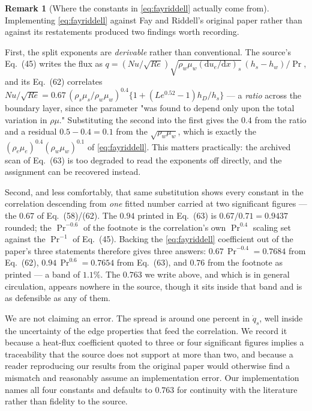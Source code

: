 \documentclass[11pt,a4paper]{article}
\theoremstyle{definition}
\newtheorem{remark}[theorem]{Remark}
\numberwithin{equation}{section}
\newcommand{\diff}{\mathrm{d}}
\begin{document}
\begin{remark}[Where the constants in \cref{eq:fayriddell} actually come from]
\label{rem:frconst}
Implementing \cref{eq:fayriddell} against Fay and Riddell's original paper rather than against its restatements produced two findings worth recording.

First, the split exponents are \emph{derivable} rather than conventional. The source's Eq.~(45) writes the flux as $q = (Nu/\!\sqrt{Re})\sqrt{\rho_w \mu_w (\diff u_e/\diff x)_s}\,(h_s - h_w)/\Pr$, and its Eq.~(62) correlates $Nu/\!\sqrt{Re} = 0.67\,(\rho_s\mu_s/\rho_w\mu_w)^{0.4}\{1 + (Le^{0.52}-1)h_D/h_s\}$ --- a \emph{ratio} across the boundary layer, since the parameter "was found to depend only upon the total variation in $\rho\mu$." Substituting the second into the first gives the $0.4$ from the ratio and a residual $0.5 - 0.4 = 0.1$ from the $\sqrt{\rho_w\mu_w}$, which is exactly the $(\rho_e\mu_e)^{0.4}(\rho_w\mu_w)^{0.1}$ of \cref{eq:fayriddell}. This matters practically: the archived scan of Eq.~(63) is too degraded to read the exponents off directly, and the assignment can be recovered instead.

Second, and less comfortably, that same substitution shows every constant in the correlation descending from \emph{one} fitted number carried at two significant figures --- the $0.67$ of Eq.~(58)/(62). The $0.94$ printed in Eq.~(63) is $0.67/0.71 = 0.9437$ rounded; the $\Pr^{-0.6}$ of the footnote is the correlation's own $\Pr^{0.4}$ scaling set against the $\Pr^{-1}$ of Eq.~(45). Backing the \cref{eq:fayriddell} coefficient out of the paper's three statements therefore gives three answers: $0.67\,\Pr^{-0.4} = 0.7684$ from Eq.~(62), $0.94\,\Pr^{0.6} = 0.7654$ from Eq.~(63), and $0.76$ from the footnote as printed --- a band of $1.1\%$. The $0.763$ we write above, and which is in general circulation, appears nowhere in the source, though it sits inside that band and is as defensible as any of them.

We are not claiming an error. The spread is around one percent in $\dot q_s$, well inside the uncertainty of the edge properties that feed the correlation. We record it because a heat-flux coefficient quoted to three or four significant figures implies a traceability that the source does not support at more than two, and because a reader reproducing our results from the original paper would otherwise find a mismatch and reasonably assume an implementation error. Our implementation names all four constants and defaults to $0.763$ for continuity with the literature rather than fidelity to the source.
\end{remark}
\end{document}

